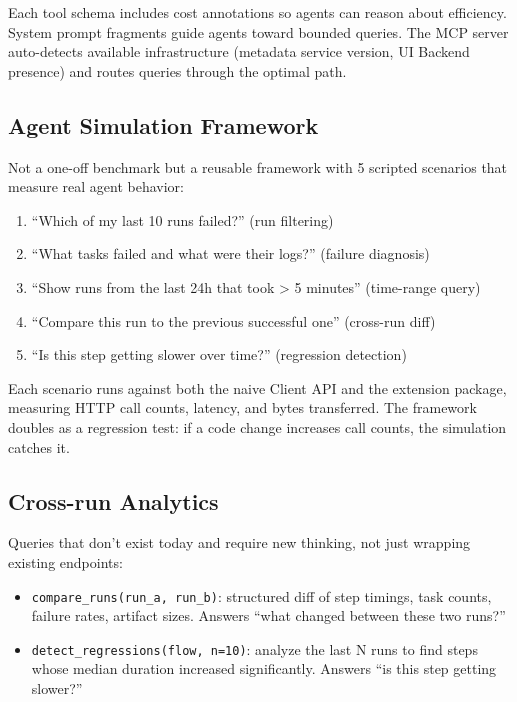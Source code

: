 \documentclass[11pt,a4paper]{article}
\begin{document}
Each tool schema includes cost annotations so agents can reason about efficiency. System prompt fragments guide agents toward bounded queries. The MCP server auto-detects available infrastructure (metadata service version, UI Backend presence) and routes queries through the optimal path.

\subsection{Agent Simulation Framework}

Not a one-off benchmark but a reusable framework with 5 scripted scenarios that measure real agent behavior:

\begin{enumerate}[nosep]
    \item ``Which of my last 10 runs failed?'' (run filtering)
    \item ``What tasks failed and what were their logs?'' (failure diagnosis)
    \item ``Show runs from the last 24h that took > 5 minutes'' (time-range query)
    \item ``Compare this run to the previous successful one'' (cross-run diff)
    \item ``Is this step getting slower over time?'' (regression detection)
\end{enumerate}

Each scenario runs against both the naive Client API and the extension package, measuring HTTP call counts, latency, and bytes transferred. The framework doubles as a regression test: if a code change increases call counts, the simulation catches it.

\subsection{Cross-run Analytics}

Queries that don't exist today and require new thinking, not just wrapping existing endpoints:

\begin{itemize}[nosep]
    \item \texttt{compare\_runs(run\_a, run\_b)}: structured diff of step timings, task counts, failure rates, artifact sizes. Answers ``what changed between these two runs?''
    \item \texttt{detect\_regressions(flow, n=10)}: analyze the last N runs to find steps whose median duration increased significantly. Answers ``is this step getting slower?''
\end{itemize}
\end{document}
